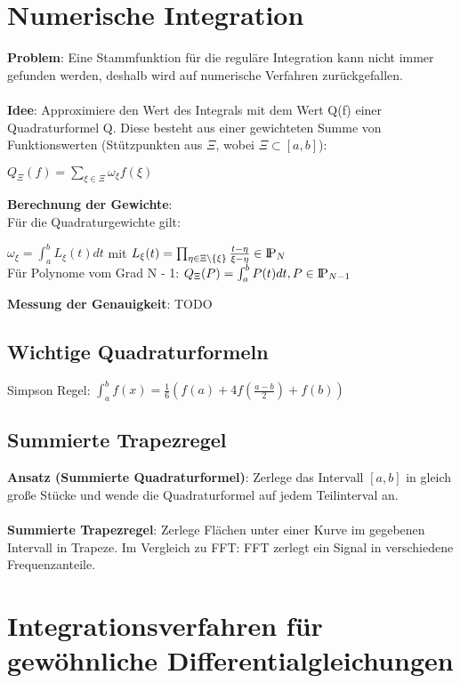 \documentclass[10pt,a4paper]{article}
\def\polynomials{{\rm I\!P}}
\begin{document}
	\section{Numerische Integration}
	\textbf{Problem}: Eine Stammfunktion für die reguläre Integration kann nicht immer gefunden werden, deshalb wird auf numerische Verfahren zurückgefallen.\\\\
	\textbf{Idee}: Approximiere den Wert des Integrals mit dem Wert Q(f) einer Quadraturformel Q. Diese besteht aus einer gewichteten Summe von Funktionswerten (Stützpunkten aus $\Xi$, wobei $\Xi \subset [a, b]$):
	\begin{center}
		$Q_\Xi(f) = \sum_{\xi \in \Xi}^{}\omega_\xi f(\xi)$
	\end{center}
	\textbf{Berechnung der Gewichte}:\\
	Für die Quadraturgewichte gilt:
	\begin{center}
		$\omega_\xi = \int_{a}^{b}L_\xi(t)dt$ mit $L_\xi(t) = \prod_{\eta \in \Xi \setminus \{\xi\}}^{} \frac{t - \eta}{\xi - \eta} \in \polynomials_N$\\
		Für Polynome vom Grad N - 1: $Q_\Xi(P) = \int_{a}^{b}P(t)dt, P \in \polynomials_{N - 1}$
	\end{center}
	\textbf{Messung der Genauigkeit}: TODO\\
        
        \subsection{Wichtige Quadraturformeln}
        Simpson Regel: $\int_{a}^{b} f(x) = \frac{1}{6} (f(a) + 4f(\frac{a-b}{2}) + f(b))$
	
	\subsection{Summierte Trapezregel}
	\textbf{Ansatz (Summierte Quadraturformel)}: Zerlege das Intervall $[a, b]$ in gleich große Stücke und wende die Quadraturformel auf jedem Teilinterval an.\\\\
	\textbf{Summierte Trapezregel}: Zerlege Flächen unter einer Kurve im gegebenen Intervall in Trapeze. Im Vergleich zu FFT: FFT zerlegt ein Signal in verschiedene Frequenzanteile.
	\newpage
	\section{Integrationsverfahren für gewöhnliche Differentialgleichungen}
\end{document}
